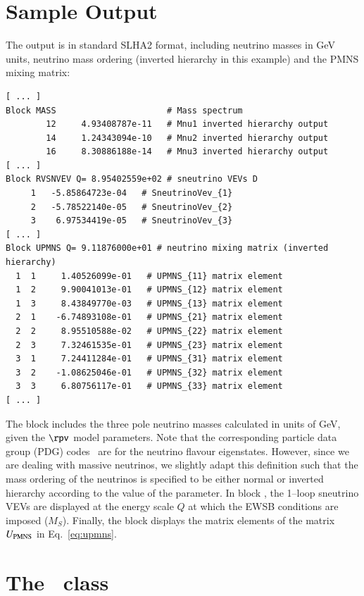\documentclass[pdflatex,final,3p,times]{elsarticle}
\begin{document}
\section{Sample Output \label{sec:output}}

The output is in standard SLHA2 format, including
neutrino masses in GeV units, neutrino mass 
ordering (inverted hierarchy 
in this example) and the PMNS mixing matrix: 
\small\begin{verbatim}
[ ... ]
Block MASS                      # Mass spectrum
        12     4.93408787e-11   # Mnu1 inverted hierarchy output
        14     1.24343094e-10   # Mnu2 inverted hierarchy output
        16     8.30886188e-14   # Mnu3 inverted hierarchy output
[ ... ]
Block RVSNVEV Q= 8.95402559e+02 # sneutrino VEVs D 
     1   -5.85864723e-04   # SneutrinoVev_{1}
     2   -5.78522140e-05   # SneutrinoVev_{2}
     3    6.97534419e-05   # SneutrinoVev_{3}
[ ... ]
Block UPMNS Q= 9.11876000e+01 # neutrino mixing matrix (inverted  hierarchy)
  1  1     1.40526099e-01   # UPMNS_{11} matrix element
  1  2     9.90041013e-01   # UPMNS_{12} matrix element
  1  3     8.43849770e-03   # UPMNS_{13} matrix element
  2  1    -6.74893108e-01   # UPMNS_{21} matrix element
  2  2     8.95510588e-02   # UPMNS_{22} matrix element
  2  3     7.32461535e-01   # UPMNS_{23} matrix element
  3  1     7.24411284e-01   # UPMNS_{31} matrix element
  3  2    -1.08625046e-01   # UPMNS_{32} matrix element
  3  3     6.80756117e-01   # UPMNS_{33} matrix element
[ ... ]
\end{verbatim}\normalsize

The block  includes the three pole neutrino masses
calculated in units of GeV, given the $\rpv$ model parameters.
Note that the corresponding particle data group (PDG) codes~\cite{pdg} are for
the 
neutrino flavour eigenstates. However, since we  
are dealing with massive neutrinos, we slightly adapt this definition such that the mass ordering of the
neutrinos is specified to be either normal or inverted hierarchy according to the value of the 
 parameter.
In block , the 1--loop sneutrino VEVs are displayed at the energy scale $Q$ at which 
the EWSB conditions are imposed ($M_S$).
Finally, the block  displays the matrix elements of the matrix
$U_{\rm PMNS}$ in Eq.~\ref{eq:upmns}.


\section{The ~class\label{sec:objects}}
\end{document}
